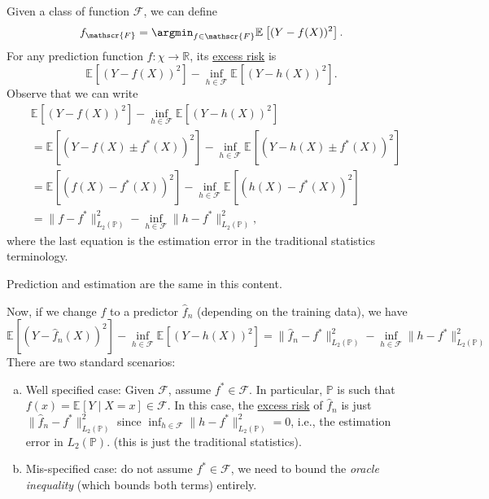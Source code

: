 Given a class of function \(\mathscr{F} \), we can define
\[
	f_{\mathscr{F} } = \argmin_{f\in \mathscr{F} } \mathbb{E}_{}\left[ ( Y - f(X) ) ^2 \right] .
\]
For any prediction function \(f\colon \chi \to \mathbb{R} \), its \hyperref[not:excess-risk]{excess risk} is
\[
	\mathbb{E}_{}\left[ ( Y - f(X) ) ^2 \right] - \inf _{h \in \mathscr{F} } \mathbb{E}_{}\left[( Y - h(X) ) ^2 \right] .
\]
Observe that we can write
\begin{align*}
	 & \mathbb{E}_{}\left[ ( Y - f(X) ) ^2 \right] - \inf _{h \in \mathscr{F} } \mathbb{E}_{}\left[( Y - h(X) ) ^2 \right]                                                      \\
	 & = \mathbb{E}_{}\left[ ( Y - f(X) \pm f^{\ast} (X) ) ^2 \right]  - \inf _{h \in \mathscr{F} } \mathbb{E}_{}\left[( Y - h(X) \pm f^{\ast} (X)) ^2 \right]                  \\
	 & = \mathbb{E}_{}\left[ ( f(X) - f^{\ast} (X) ) ^2 \right] - \inf _{h \in \mathscr{F} } \mathbb{E}_{}\left[( h(X) - f^{\ast} (X) ) ^2 \right] \tag*{cross terms are \(0\)} \\
	 & = \lVert f - f^{\ast}  \rVert _{L_2(\mathbb{P} )}^2 - \inf _{h\in \mathscr{F} } \lVert h - f^{\ast}  \rVert _{L_2(\mathbb{P} )} ^2,
\end{align*}
where the last equation is the estimation error in the traditional statistics terminology.

\begin{remark}
	Prediction and estimation are the same in this content.
\end{remark}

Now, if we change \(f\) to a predictor \(\hat{f} _n \) (depending on the training data), we have
\[
	\mathbb{E}_{}\left[ ( Y - \hat{f} _n(X) ) ^2 \right] - \inf _{h \in \mathscr{F} } \mathbb{E}_{}\left[ ( Y - h(X) ) ^2 \right]
	= \lVert \hat{f} _n - f^{\ast}  \rVert _{L_2(\mathbb{P} )}^2 - \inf _{h\in \mathscr{F} } \lVert h - f^{\ast}  \rVert _{L_2(\mathbb{P} )} ^2
\]
There are two standard scenarios:
\begin{enumerate}[(a)]
	\item Well specified case: Given \(\mathscr{F} \), assume \(f^{\ast} \in \mathscr{F} \). In particular, \(\mathbb{P} \) is such that \(f(x) = \mathbb{E}_{}\left[Y \mid X = x \right] \in \mathscr{F} \). In this case, the \hyperref[not:excess-risk]{excess risk} of \(\hat{f} _n \) is just \(\lVert \hat{f} _n - f^{\ast} \rVert _{L_2(\mathbb{P} )}^2 \) since \(\inf _{h\in \mathscr{F} } \lVert h - f^{\ast} \rVert ^2 _{L_2(\mathbb{P} )} = 0\), i.e., the estimation error in \(L_2(\mathbb{P} )\). (this is just the traditional statistics).
	\item Mis-specified case: do not assume \(f^{\ast} \in \mathscr{F} \), we need to bound the \emph{oracle inequality} (which bounds both terms) entirely.
\end{enumerate}